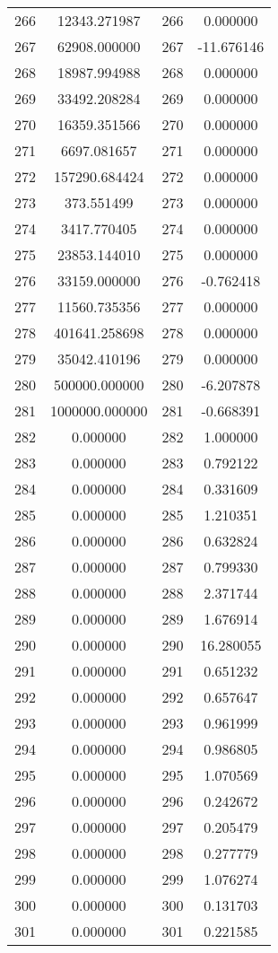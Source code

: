 \documentclass[12pt]{article}
\begin{document}
\begin{longtable}{@{}cccc@{}}
266 & 12343.271987 & 266 & 0.000000 \\
267 & 62908.000000 & 267 & -11.676146 \\
268 & 18987.994988 & 268 & 0.000000 \\
269 & 33492.208284 & 269 & 0.000000 \\
270 & 16359.351566 & 270 & 0.000000 \\
271 & 6697.081657 & 271 & 0.000000 \\
272 & 157290.684424 & 272 & 0.000000 \\
273 & 373.551499 & 273 & 0.000000 \\
274 & 3417.770405 & 274 & 0.000000 \\
275 & 23853.144010 & 275 & 0.000000 \\
276 & 33159.000000 & 276 & -0.762418 \\
277 & 11560.735356 & 277 & 0.000000 \\
278 & 401641.258698 & 278 & 0.000000 \\
279 & 35042.410196 & 279 & 0.000000 \\
280 & 500000.000000 & 280 & -6.207878 \\
281 & 1000000.000000 & 281 & -0.668391 \\
282 & 0.000000 & 282 & 1.000000 \\
283 & 0.000000 & 283 & 0.792122 \\
284 & 0.000000 & 284 & 0.331609 \\
285 & 0.000000 & 285 & 1.210351 \\
286 & 0.000000 & 286 & 0.632824 \\
287 & 0.000000 & 287 & 0.799330 \\
288 & 0.000000 & 288 & 2.371744 \\
289 & 0.000000 & 289 & 1.676914 \\
290 & 0.000000 & 290 & 16.280055 \\
291 & 0.000000 & 291 & 0.651232 \\
292 & 0.000000 & 292 & 0.657647 \\
293 & 0.000000 & 293 & 0.961999 \\
294 & 0.000000 & 294 & 0.986805 \\
295 & 0.000000 & 295 & 1.070569 \\
296 & 0.000000 & 296 & 0.242672 \\
297 & 0.000000 & 297 & 0.205479 \\
298 & 0.000000 & 298 & 0.277779 \\
299 & 0.000000 & 299 & 1.076274 \\
300 & 0.000000 & 300 & 0.131703 \\
301 & 0.000000 & 301 & 0.221585 \\

\end{longtable}
\end{document}
